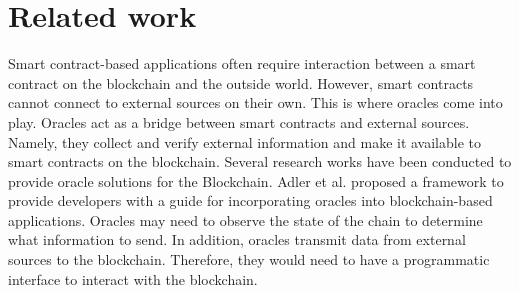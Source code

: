 \documentclass[a4paper,USenglish,american,cleveref, autoref, thm-restate]{oasics-v2021}
\begin{document}
\section{Related work}
\label{sec:related-work}



Smart contract-based applications often require interaction between a smart contract on the blockchain and the outside world. However, smart contracts cannot connect to external sources on their own. This is where oracles \cite{oracle-patterns,call-action-oracle} come into play. Oracles act as a bridge between smart contracts and external sources. Namely, they collect and verify external information and make it available to smart contracts on the blockchain. Several research works have been conducted to provide oracle solutions for the Blockchain. Adler et al.\cite{blockchain-oracles} proposed a framework to provide developers with a guide for incorporating oracles into blockchain-based applications. Oracles may need to observe the state of the chain to determine what information to send. In addition, oracles transmit data from external sources to the blockchain. Therefore, they would need to have a programmatic interface to interact with the blockchain. %

\end{document}
